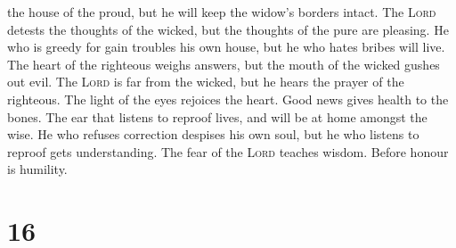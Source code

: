 the house of the proud, but he will keep the widow's borders intact.
 The \textsc{Lord} detests the thoughts of the wicked,
but the thoughts of the pure are pleasing.  He who is
greedy for gain troubles his own house, but he who hates bribes will
live.  The heart of the righteous weighs answers, but the
mouth of the wicked gushes out evil.  The \textsc{Lord}
is far from the wicked, but he hears the prayer of the righteous.
 The light of the eyes rejoices the heart. Good news
gives health to the bones.  The ear that listens to
reproof lives, and will be at home amongst the wise.  He
who refuses correction despises his own soul, but he who listens to
reproof gets understanding.  The fear of the
\textsc{Lord} teaches wisdom. Before honour is humility.

\hypertarget{section-15}{%
\section{16}\label{section-15}}

